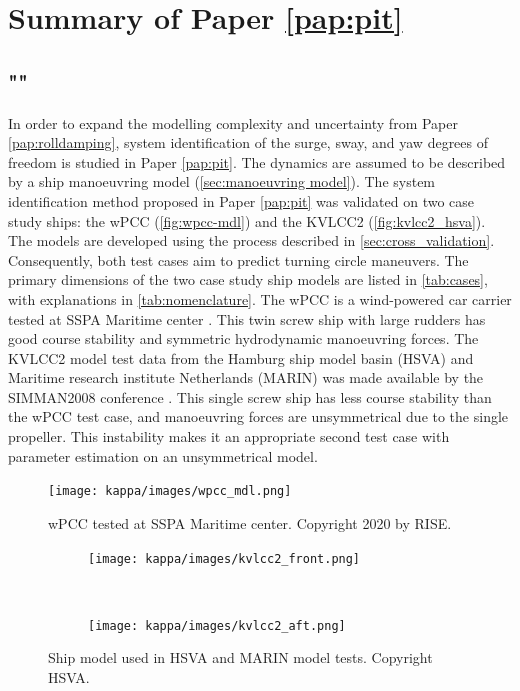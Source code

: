 \section{Summary of Paper \ref{pap:pit}}
\subsection*{""}
In order to expand the modelling complexity and uncertainty from Paper \ref{pap:rolldamping}, system identification of the surge, sway, and yaw degrees of freedom is studied in Paper \ref{pap:pit}. The dynamics are assumed to be described by a ship manoeuvring model (\autoref{sec:manoeuvring model}). The system identification method proposed in Paper \ref{pap:pit} was validated on two case study ships: the wPCC (\autoref{fig:wpcc-mdl}) and the KVLCC2 (\autoref{fig:kvlcc2_hsva}). The models are developed using the process described in \autoref{sec:cross_validation}. Consequently, both test cases aim to predict turning circle maneuvers. The primary dimensions of the two case study ship models are listed in \autoref{tab:cases}, with explanations in \autoref{tab:nomenclature}. The wPCC is a wind-powered car carrier tested at SSPA Maritime center \cite{alexanderssonWPCCManoeuvringModel2022a}. This twin screw ship with large rudders has good course stability and symmetric hydrodynamic manoeuvring forces. The KVLCC2 model test data from the Hamburg ship model basin (HSVA) and Maritime research institute Netherlands (MARIN) was made available by the SIMMAN2008 conference \cite{sternExperienceSIMMAN20082011}. This single screw ship has less course stability than the wPCC test case, and manoeuvring forces are unsymmetrical due to the single propeller. This instability makes it an appropriate second test case with parameter estimation on an unsymmetrical model.

\begin{figure}[h!]
\centering
\texttt{[image: kappa/images/wpcc\_mdl.png]}
\caption{wPCC tested at SSPA Maritime center. Copyright 2020 by RISE.}
\label{fig:wpcc-mdl}
\end{figure}

\begin{figure}[h!]
    \centering
    \begin{subfigure}[b]{0.45\textwidth}
    \centering
    \texttt{[image: kappa/images/kvlcc2\_front.png]}
    \end{subfigure}
    ~
     \begin{subfigure}[b]{0.45\textwidth}
     \centering
     \texttt{[image: kappa/images/kvlcc2\_aft.png]}
     \end{subfigure}
    \caption{Ship model used in HSVA and MARIN model tests. Copyright HSVA.}
    \label{fig:kvlcc2_hsva}
\end{figure}


